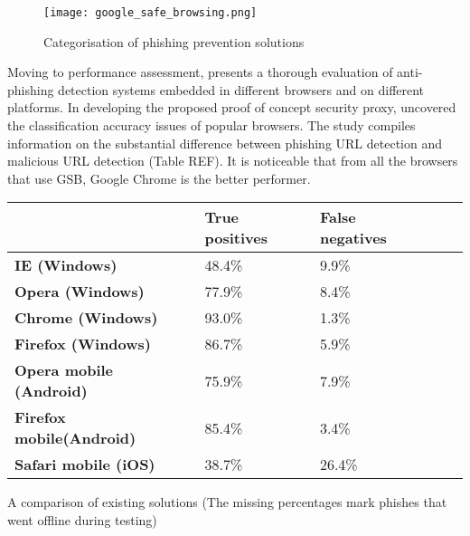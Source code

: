 \begin{figure}[t]
	\centering
	\texttt{[image: google\_safe\_browsing.png]}
	\caption{
		Categorisation of phishing prevention solutions
		\citep{ML_BASED_DETECTION_FROM_URL}}
	\label{fig:PHISHING_SOLUTION_CATEGS}
\end{figure}

Moving to performance assessment, \cite{SECURITY_BUSTERS} presents a thorough evaluation of anti-phishing detection systems embedded in different browsers and on different platforms. In developing the proposed proof of concept security proxy, \cite{SECURITY_BUSTERS} uncovered the classification accuracy issues of popular browsers. The study compiles information on the substantial difference between phishing URL detection and malicious URL detection (Table REF). It is noticeable that from all the browsers that use GSB, Google Chrome is the better performer.

\begin{singlespace}
	\small
	\begin{center}
		\label{tab:OPTIMISED_MODELS}
		\begin{tabular}{ | m{8em} | m{13em} | m{8.5em} | m{2.3em} | m{5em} | }
			\hline
			                                 & \textbf{True positives} & \textbf{False negatives} \\
			\hline
			\textbf{IE (Windows)}            & 48.4\%                  & 9.9\%                    \\
			\hline
			\textbf{Opera (Windows)}         & 77.9\%                   & 8.4\%                    \\
			\hline
			\textbf{Chrome (Windows)}        & 93.0\%                   & 1.3\%                    \\
			\hline
			\textbf{Firefox (Windows)}       & 86.7\%                   & 5.9\%                    \\
			\hline
			\textbf{Opera mobile (Android)}  & 75.9\%                   & 7.9\%                    \\
			\hline
			\textbf{Firefox mobile(Android)} & 85.4\%                   & 3.4\%                    \\
			\hline
			\textbf{Safari mobile (iOS)}     & 38.7\%                   & 26.4\%                    \\
			\hline
		\end{tabular}
		\captionsetup{type=table}\caption{A comparison of existing solutions (The missing percentages mark phishes that went offline during testing) \citep{INTELLIGENT_PHISHING_ANFIS}}
	\end{center}
\end{singlespace}

